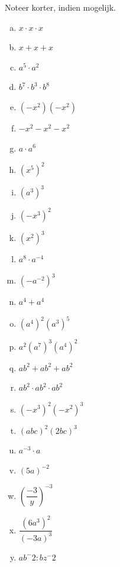\documentclass[12pt,twoside]{article}
\begin{document}
\begin{oefening}
Noteer korter, indien mogelijk.
\begin{multicols}{3}
  \begin{enumerate}[(a)]
    \itemsep1.5em
    \item $x\cdot x\cdot x$
    \item $x+x+x$
    \item $a^5\cdot a^2$
    \item $b^7\cdot b^3\cdot b^8$
    \item $\left(-x^2\right)\left(-x^2\right)$
    \item $-x^2-x^2-x^2$
    \item $a\cdot a^6$
    \item $\left(x^5\right)^2$
    \item $\left(a^3\right)^3$
    \item $\left(-x^3\right)^2$
    \item $\left(x^2\right)^3$
    \item $a^8\cdot a^{-4}$
    \item $\left(-a^{-2}\right)^3$
    \item $a^4+a^4$
    \item $\left(a^4\right)^2\left(a^3\right)^5$
    \item $a^2\left(a^7\right)^3\left(a^4\right)^2$
    \item $ab^2+ab^2+ab^2$
    \item $ab^2\cdot ab^2\cdot ab^2$
    \item $\left(-x^3\right)^2\left(-x^2\right)^3$
    \item $\left(abc\right)^2\left(2bc\right)^3$
    \item $a^{-3}\cdot a$
    \item $\left(5a\right)^{-2}$
    \item $\left(\dfrac{-3}{y}\right)^{-3}$
    \item $\dfrac{\left(6a^3\right)^2}{\left(-3a\right)^3}$
    \item $ab^-2:bz^-2$
  \end{enumerate}
\end{multicols}
\end{oefening}
\end{document}
